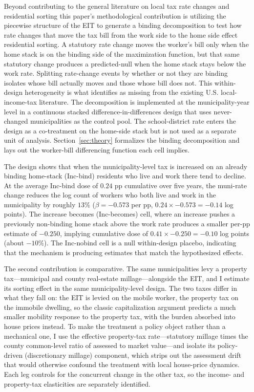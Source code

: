 \documentclass[12pt]{article}
\begin{document}
Beyond contributing to the general literature on local tax rate changes and residential sorting  this paper's methodological contribution is utilizing the piecewise structure of the EIT to generate a binding decomposition to test how rate changes that move the tax bill from the work side to the home side effect residential sorting. A statutory rate change moves the worker's bill only when the home stack is on the binding side of the
maximization function, but that same statutory change produces a predicted-null when
the home stack stays below the work rate. Splitting
rate-change events by whether or not they are binding isolates
whose bill actually moves and those whose bill does not. This within-design heterogeneity is what \citet{agrawalLessonsStateLocal} identifies as missing from the existing U.S. local-income-tax literature.
The decomposition is implemented at the municipality-year level in
a continuous stacked difference-in-differences design that uses
never-changed municipalities as the control pool. The
school-district rate enters the design as a co-treatment on the
home-side stack but is not used as a separate unit of analysis.
Section~\ref{sec:theory} formalizes the binding decomposition and
lays out the worker-bill differencing function each cell implies.

The design shows that when the municipality-level tax is increased on an already binding home-stack (Inc-bind) residents who live and work there tend to decline. At the average Inc-bind dose of $0.24$ pp cumulative
over five years, the muni-rate change reduces the log count of
workers who both live and work in the municipality by roughly
$13\%$ ($\beta = -0.573$ per pp, $0.24 \times -0.573 = -0.14$ log
points). The increase becomes (Inc-becomes) cell, where an increase pushes a
previously non-binding home stack above the work rate produces a
smaller per-pp estimate of $-0.250$, implying cumulative dose of $0.41 \times -0.250 =
-0.10$ log points (about $-10\%$). The Inc-nobind cell is a null
within-design placebo, indicating that the mechanism is producing estimates that match the hypothesized effects.

The second contribution is comparative. The same municipalities levy a
property tax---municipal and county real-estate millage---alongside the
EIT, and I estimate its sorting effect in the same municipality-level
design. The two taxes differ in what they fall on: the EIT is levied on
the mobile worker, the property tax on the immobile dwelling, so the
classic capitalization argument \citep{oates1969} predicts a much
smaller mobility response to the property tax, with the burden absorbed
into house prices instead. To make the treatment a policy object rather
than a mechanical one, I use the effective property-tax rate---statutory
millage times the county common-level ratio of assessed to market
value---and isolate its policy-driven (discretionary millage) component,
which strips out the assessment drift that would otherwise confound the
treatment with local house-price dynamics. Each leg controls for the
concurrent change in the other tax, so the income- and property-tax
elasticities are separately identified.
\end{document}
